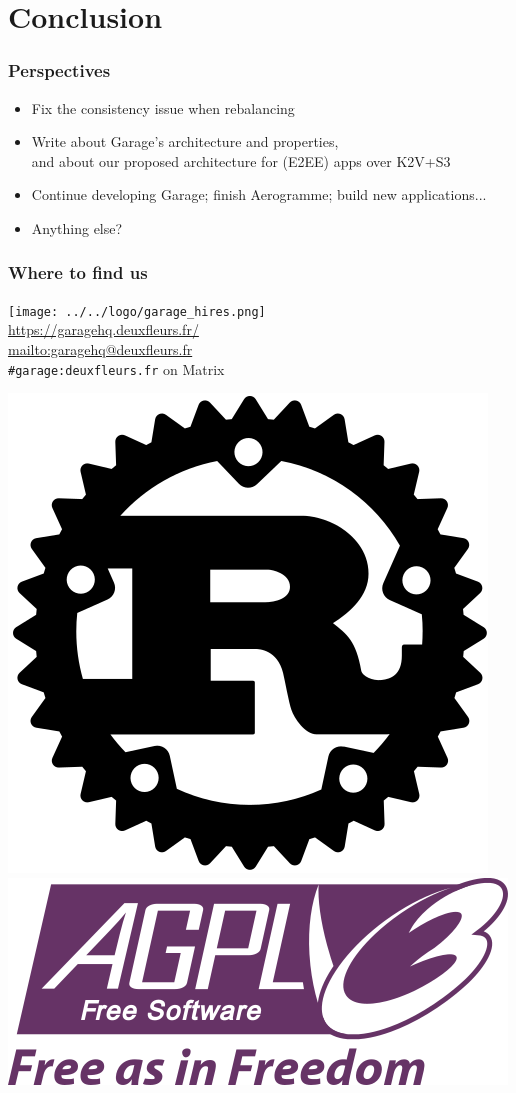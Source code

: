 \documentclass[aspectratio=169]{beamer}
\begin{document}
\section{Conclusion}

\begin{frame}
	\frametitle{Perspectives}
	\begin{itemize}
		\item Fix the consistency issue when rebalancing
			\vspace{1em}
		\item Write about Garage's architecture and properties,\\
			and about our proposed architecture for (E2EE) apps over K2V+S3
			\vspace{1em}
		\item Continue developing Garage; finish Aerogramme; build new applications...
			\vspace{1em}
		\item Anything else?
	\end{itemize}
\end{frame}

\begin{frame}
	\frametitle{Where to find us}
	\begin{center}
			\texttt{[image: ../../logo/garage\_hires.png]}\\
			\vspace{-1em}
		\url{https://garagehq.deuxfleurs.fr/}\\
		\url{mailto:garagehq@deuxfleurs.fr}\\
		\texttt{\#garage:deuxfleurs.fr} on Matrix

		\vspace{1.5em}
			\includegraphics[width=.06\linewidth]{assets/rust_logo.png}
			\includegraphics[width=.13\linewidth]{assets/AGPLv3_Logo.png}
	\end{center}
\end{frame}
\end{document}
